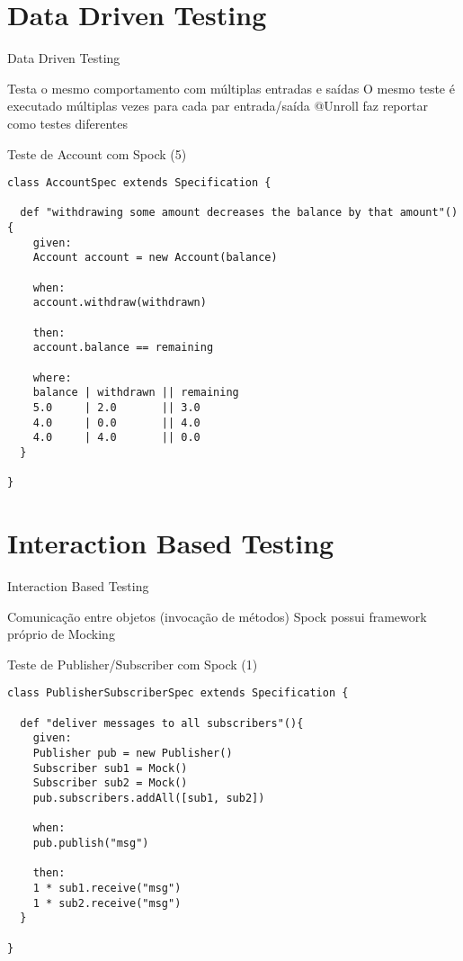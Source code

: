 \documentclass{beamer}
\begin{document}
\section{Data Driven Testing}

\begin{frame}{Data Driven Testing}
 \begin{outline}
    Testa o mesmo comportamento com múltiplas entradas e saídas
    O mesmo teste é executado múltiplas vezes para cada par entrada/saída
    @Unroll faz reportar como testes diferentes
 \end{outline}
\end{frame}

\begin{frame}[fragile]{Teste de Account com Spock (5)}
 \begin{verbatim}
class AccountSpec extends Specification {
  
  def "withdrawing some amount decreases the balance by that amount"(){
    given:
    Account account = new Account(balance)
    
    when:
    account.withdraw(withdrawn)
    
    then:
    account.balance == remaining
    
    where:
    balance | withdrawn || remaining
    5.0     | 2.0       || 3.0
    4.0     | 0.0       || 4.0
    4.0     | 4.0       || 0.0
  }
  
}
  \end{verbatim}
\end{frame}

\section{Interaction Based Testing}

\begin{frame}{Interaction Based Testing}
 \begin{outline}
    Comunicação entre objetos (invocação de métodos)
    Spock possui framework próprio de Mocking
 \end{outline}
\end{frame}

\begin{frame}[fragile]{Teste de Publisher/Subscriber com Spock (1)}
 \begin{verbatim}
class PublisherSubscriberSpec extends Specification {

  def "deliver messages to all subscribers"(){
    given:
    Publisher pub = new Publisher()
    Subscriber sub1 = Mock()
    Subscriber sub2 = Mock()
    pub.subscribers.addAll([sub1, sub2])
    
    when:
    pub.publish("msg")
    
    then:
    1 * sub1.receive("msg")
    1 * sub2.receive("msg")
  }
  
}
  \end{verbatim}
\end{frame}
\end{document}

